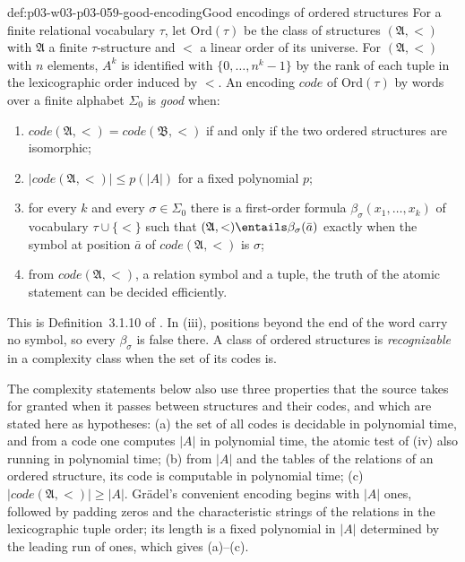 \begin{hbdefinition}{def:p03-w03-p03-059-good-encoding}{Good encodings of ordered structures}
For a finite relational vocabulary \(\tau\), let \(\mathrm{Ord}(\tau)\) be
the class of structures \((\mathfrak A,<)\) with \(\mathfrak A\) a finite
\(\tau\)-structure and \(<\) a linear order of its universe. For
\((\mathfrak A,<)\) with \(n\) elements, \(A^k\) is identified with
\(\{0,\ldots,n^k-1\}\) by the rank of each tuple in the lexicographic order
induced by \(<\). An encoding \(\mathit{code}\) of \(\mathrm{Ord}(\tau)\) by
words over a finite alphabet \(\Sigma_0\) is \emph{good} when:
\begin{enumerate}
 \item[(i)] \(\mathit{code}(\mathfrak A,<)=\mathit{code}(\mathfrak B,<)\)
       if and only if the two ordered structures are isomorphic;
 \item[(ii)] \(|\mathit{code}(\mathfrak A,<)|\leq p(|A|)\) for a fixed
       polynomial \(p\);
 \item[(iii)] for every \(k\) and every \(\sigma\in\Sigma_0\) there is a
       first-order formula \(\beta_\sigma(x_1,\ldots,x_k)\) of vocabulary
       \(\tau\cup\{<\}\) such that \((\mathfrak A,<)\entails
       \beta_\sigma(\bar a)\) exactly when the symbol at position
       \(\bar a\) of \(\mathit{code}(\mathfrak A,<)\) is \(\sigma\);
 \item[(iv)] from \(\mathit{code}(\mathfrak A,<)\), a relation symbol and a
       tuple, the truth of the atomic statement can be decided
       efficiently.
\end{enumerate}
This is Definition~3.1.10 of \cite[p.~136]{Gradel2007FMTDescriptiveChapter}. In (iii),
positions beyond the end of the word carry no symbol, so every
\(\beta_\sigma\) is false there. A class of ordered structures is
\emph{recognizable} in a complexity class when the set of its codes is.

The complexity statements below also use three properties that the source
takes for granted when it passes between structures and their codes, and
which are stated here as hypotheses: (a) the set of all codes is decidable
in polynomial time, and from a code one computes \(|A|\) in polynomial
time, the atomic test of (iv) also running in polynomial time; (b) from
\(|A|\) and the tables of the relations of an ordered structure, its code
is computable in polynomial time; (c)
\(|\mathit{code}(\mathfrak A,<)|\geq|A|\). Gr\"adel's convenient encoding
\cite[p.~136]{Gradel2007FMTDescriptiveChapter} begins with \(|A|\) ones, followed by
padding zeros and the characteristic strings of the relations in the
lexicographic tuple order; its length is a fixed polynomial in \(|A|\)
determined by the leading run of ones, which gives (a)--(c).
\end{hbdefinition}

